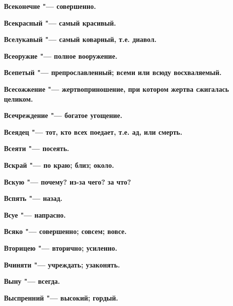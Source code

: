 \bfseries Всеконечне \normalfont{} "--- совершенно. 




\bfseries Всекрасный \normalfont{} "--- самый красивый. 




\bfseries Вселукавый \normalfont{} "--- самый коварный, т.е. диавол. 




\bfseries Всеоружие \normalfont{} "--- полное вооружение. 




\bfseries Всепетый \normalfont{} "--- препрославленный; всеми или всюду восхваляемый. 




\bfseries Всесожжение \normalfont{} "--- жертвоприношение, при котором жертва сжигалась целиком. 




\bfseries Всечреждение \normalfont{} "--- богатое угощение. 




\bfseries Всеядец \normalfont{} "--- тот, кто всех поедает, т.е. ад, или смерть. 




\bfseries Всеяти \normalfont{} "--- посеять. 




\bfseries Вскрай \normalfont{} "--- по краю; близ; около. 




\bfseries Вскую \normalfont{} "--- почему? из-за чего? за что? 




\bfseries Вспять \normalfont{} "--- назад. 




\bfseries Всуе \normalfont{} "--- напрасно. 




\bfseries Всяко \normalfont{} "--- совершенно; совсем; вовсе. 




\bfseries Вторицею \normalfont{} "--- вторично; усиленно. 




\bfseries Вчиняти \normalfont{} "--- учреждать; узаконять. 




\bfseries Выну \normalfont{} "--- всегда. 




\bfseries Выспренний \normalfont{} "--- высокий; гордый. 




